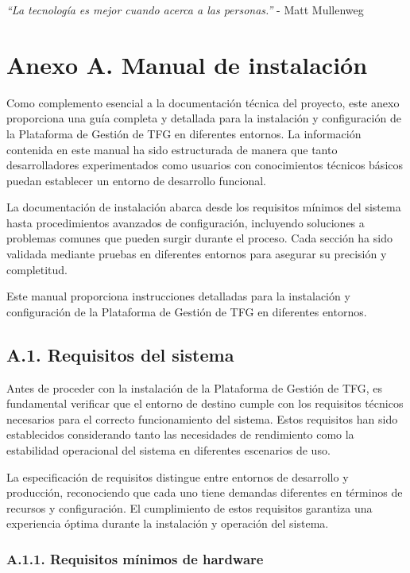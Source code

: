 \documentclass[12pt,a4paper,oneside]{report}
\begin{document}
\emph{``La tecnología es mejor cuando acerca a las personas.''} - Matt
Mullenweg

\chapter{Anexo A. Manual de
instalación}\label{anexo-a.-manual-de-instalaciuxf3n}

Como complemento esencial a la documentación técnica del proyecto, este
anexo proporciona una guía completa y detallada para la instalación y
configuración de la Plataforma de Gestión de TFG en diferentes entornos.
La información contenida en este manual ha sido estructurada de manera
que tanto desarrolladores experimentados como usuarios con conocimientos
técnicos básicos puedan establecer un entorno de desarrollo funcional.

La documentación de instalación abarca desde los requisitos mínimos del
sistema hasta procedimientos avanzados de configuración, incluyendo
soluciones a problemas comunes que pueden surgir durante el proceso.
Cada sección ha sido validada mediante pruebas en diferentes entornos
para asegurar su precisión y completitud.

Este manual proporciona instrucciones detalladas para la instalación y
configuración de la Plataforma de Gestión de TFG en diferentes entornos.

\section{A.1. Requisitos del sistema}\label{a.1.-requisitos-del-sistema}

Antes de proceder con la instalación de la Plataforma de Gestión de TFG,
es fundamental verificar que el entorno de destino cumple con los
requisitos técnicos necesarios para el correcto funcionamiento del
sistema. Estos requisitos han sido establecidos considerando tanto las
necesidades de rendimiento como la estabilidad operacional del sistema
en diferentes escenarios de uso.

La especificación de requisitos distingue entre entornos de desarrollo y
producción, reconociendo que cada uno tiene demandas diferentes en
términos de recursos y configuración. El cumplimiento de estos
requisitos garantiza una experiencia óptima durante la instalación y
operación del sistema.

\subsection{A.1.1. Requisitos mínimos de
hardware}\label{a.1.1.-requisitos-muxednimos-de-hardware}
\end{document}
